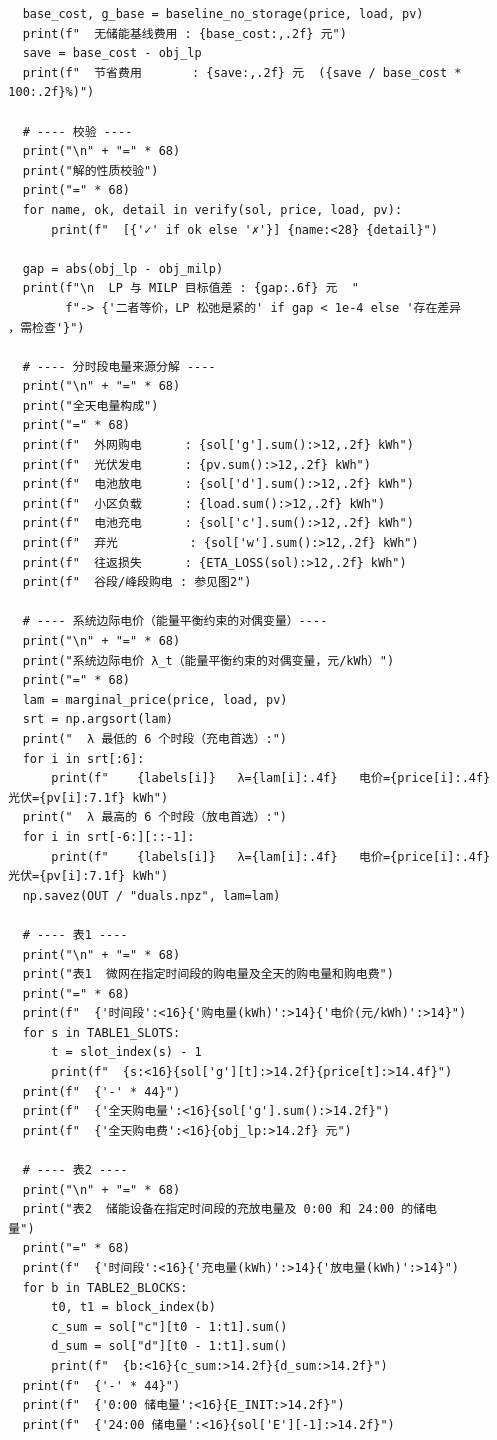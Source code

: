 \begin{verbatim}
    base_cost, g_base = baseline_no_storage(price, load, pv)
    print(f"  无储能基线费用 : {base_cost:,.2f} 元")
    save = base_cost - obj_lp
    print(f"  节省费用       : {save:,.2f} 元  ({save / base_cost *
  100:.2f}%)")

    # ---- 校验 ----
    print("\n" + "=" * 68)
    print("解的性质校验")
    print("=" * 68)
    for name, ok, detail in verify(sol, price, load, pv):
        print(f"  [{'✓' if ok else '✗'}] {name:<28} {detail}")

    gap = abs(obj_lp - obj_milp)
    print(f"\n  LP 与 MILP 目标值差 : {gap:.6f} 元  "
          f"-> {'二者等价，LP 松弛是紧的' if gap < 1e-4 else '存在差异
  ，需检查'}")

    # ---- 分时段电量来源分解 ----
    print("\n" + "=" * 68)
    print("全天电量构成")
    print("=" * 68)
    print(f"  外网购电      : {sol['g'].sum():>12,.2f} kWh")
    print(f"  光伏发电      : {pv.sum():>12,.2f} kWh")
    print(f"  电池放电      : {sol['d'].sum():>12,.2f} kWh")
    print(f"  小区负载      : {load.sum():>12,.2f} kWh")
    print(f"  电池充电      : {sol['c'].sum():>12,.2f} kWh")
    print(f"  弃光          : {sol['w'].sum():>12,.2f} kWh")
    print(f"  往返损失      : {ETA_LOSS(sol):>12,.2f} kWh")
    print(f"  谷段/峰段购电 : 参见图2")

    # ---- 系统边际电价（能量平衡约束的对偶变量）----
    print("\n" + "=" * 68)
    print("系统边际电价 λ_t（能量平衡约束的对偶变量，元/kWh）")
    print("=" * 68)
    lam = marginal_price(price, load, pv)
    srt = np.argsort(lam)
    print("  λ 最低的 6 个时段（充电首选）:")
    for i in srt[:6]:
        print(f"    {labels[i]}   λ={lam[i]:.4f}   电价={price[i]:.4f}
  光伏={pv[i]:7.1f} kWh")
    print("  λ 最高的 6 个时段（放电首选）:")
    for i in srt[-6:][::-1]:
        print(f"    {labels[i]}   λ={lam[i]:.4f}   电价={price[i]:.4f}
  光伏={pv[i]:7.1f} kWh")
    np.savez(OUT / "duals.npz", lam=lam)

    # ---- 表1 ----
    print("\n" + "=" * 68)
    print("表1  微网在指定时间段的购电量及全天的购电量和购电费")
    print("=" * 68)
    print(f"  {'时间段':<16}{'购电量(kWh)':>14}{'电价(元/kWh)':>14}")
    for s in TABLE1_SLOTS:
        t = slot_index(s) - 1
        print(f"  {s:<16}{sol['g'][t]:>14.2f}{price[t]:>14.4f}")
    print(f"  {'-' * 44}")
    print(f"  {'全天购电量':<16}{sol['g'].sum():>14.2f}")
    print(f"  {'全天购电费':<16}{obj_lp:>14.2f} 元")

    # ---- 表2 ----
    print("\n" + "=" * 68)
    print("表2  储能设备在指定时间段的充放电量及 0:00 和 24:00 的储电
  量")
    print("=" * 68)
    print(f"  {'时间段':<16}{'充电量(kWh)':>14}{'放电量(kWh)':>14}")
    for b in TABLE2_BLOCKS:
        t0, t1 = block_index(b)
        c_sum = sol["c"][t0 - 1:t1].sum()
        d_sum = sol["d"][t0 - 1:t1].sum()
        print(f"  {b:<16}{c_sum:>14.2f}{d_sum:>14.2f}")
    print(f"  {'-' * 44}")
    print(f"  {'0:00 储电量':<16}{E_INIT:>14.2f}")
    print(f"  {'24:00 储电量':<16}{sol['E'][-1]:>14.2f}")


\end{verbatim}
